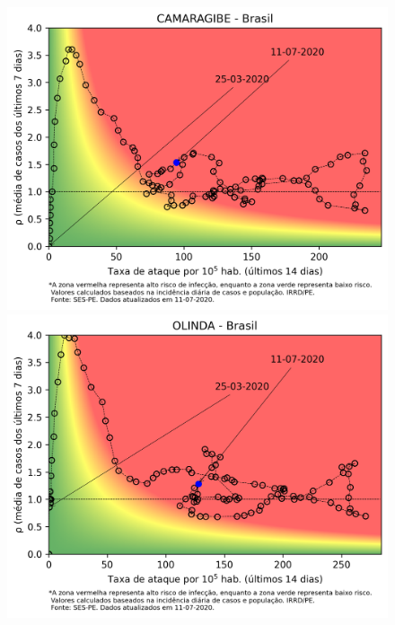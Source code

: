 \documentclass[]{article}
\begin{document}
\begin{figure}[!h]
	\begin{minipage}[t]{4cm}
		\centering
		\includegraphics[scale=0.5]{../CAMARAGIBE.png}
	\end{minipage}
	\hspace{5cm}
	\begin{minipage}[t]{4cm}
		\centering
		\includegraphics[scale=0.5]{../OLINDA.png}
		\vspace{0.2cm}
	\end{minipage}


\end{figure}
\end{document}

